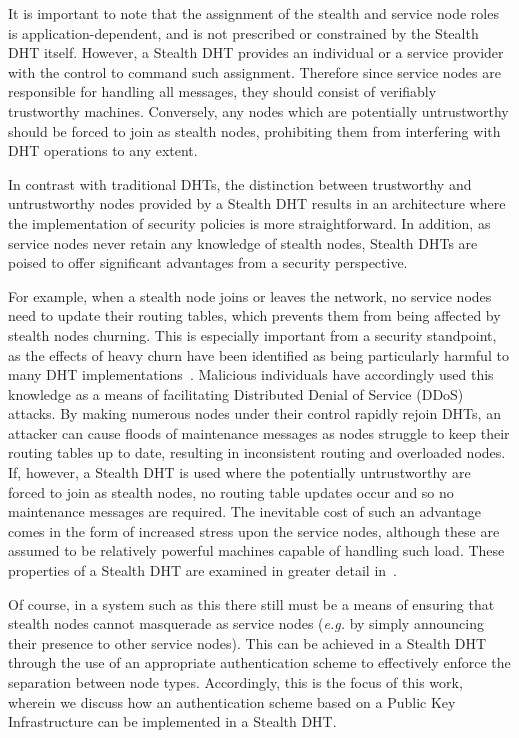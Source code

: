 \documentclass{elsart3p}
\begin{document}
It is important to note that the assignment of the stealth and
service node roles is application-dependent, and is not prescribed
or constrained by the Stealth DHT itself.
However, a Stealth DHT provides an individual or a service provider
with the control to command such assignment. Therefore since service
nodes are responsible for
handling all messages, they should consist of verifiably trustworthy
machines. Conversely, any nodes which are potentially untrustworthy
should be forced to join as stealth nodes, prohibiting them from
interfering with DHT operations to any extent.

In contrast with traditional DHTs, the distinction between
trustworthy and untrustworthy nodes provided by a Stealth DHT
results in an architecture where the implementation of security
policies is more straightforward. In addition, as service nodes
never retain any knowledge of stealth nodes, Stealth DHTs are poised
to offer significant advantages from a security perspective.

For example, when a stealth node joins or leaves the network, no
service nodes need to update their routing tables, which prevents
them from being affected by stealth nodes churning. This is
especially important from a security standpoint, as the effects of
heavy churn have been identified as being particularly harmful to
many DHT implementations~\cite{Rhea04Handling,Li04Comparing}.
Malicious individuals have accordingly used this knowledge as a
means of facilitating Distributed Denial of Service (DDoS) attacks.
By making numerous nodes under their control rapidly rejoin DHTs, an
attacker can cause floods of maintenance messages as nodes struggle
to keep their routing tables up to date, resulting in inconsistent
routing and overloaded nodes. If, however, a Stealth DHT is used
where the potentially untrustworthy are forced to join as stealth
nodes, no routing table updates occur and so no maintenance messages
are required. The inevitable cost of such an advantage comes in the
form of increased stress upon the service nodes, although these are
assumed to be relatively powerful machines capable of handling such
load. These properties of a Stealth DHT are examined in greater
detail in~\cite{Brampton06Stealth}.

Of course, in a system such as this there still must be a means of
ensuring that stealth nodes cannot masquerade as service nodes
(\emph{e.g.} by simply announcing their presence to other service
nodes). This can be achieved in a Stealth DHT through the use of an
appropriate authentication scheme to effectively enforce the
separation between node types. Accordingly, this is the focus of
this work, wherein we discuss how an authentication scheme based on
a Public Key Infrastructure can be implemented in a Stealth DHT.
\end{document}
